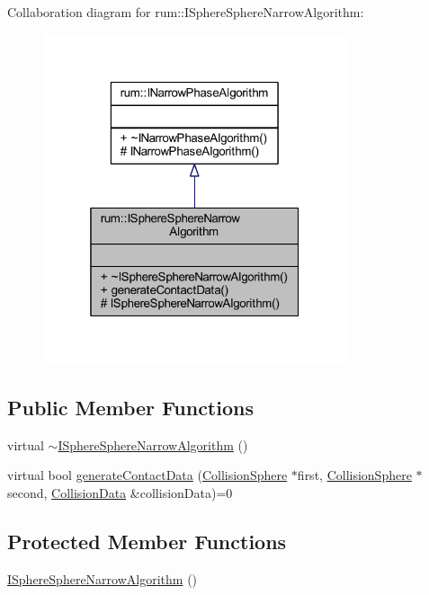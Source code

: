 Collaboration diagram for rum\+:\+:I\+Sphere\+Sphere\+Narrow\+Algorithm\+:\nopagebreak
\begin{figure}[H]
\begin{center}
\leavevmode
\includegraphics[width=253pt]{classrum_1_1_i_sphere_sphere_narrow_algorithm__coll__graph}
\end{center}
\end{figure}
\subsection*{Public Member Functions}
\begin{DoxyCompactItemize}
\item 
virtual \mbox{\hyperlink{classrum_1_1_i_sphere_sphere_narrow_algorithm_a48eb6187f1c07d3b7628778e6a818595}{$\sim$\+I\+Sphere\+Sphere\+Narrow\+Algorithm}} ()
\item 
virtual bool \mbox{\hyperlink{classrum_1_1_i_sphere_sphere_narrow_algorithm_a254273c64cab0473820639283f1e5e6f}{generate\+Contact\+Data}} (\mbox{\hyperlink{classrum_1_1_collision_sphere}{Collision\+Sphere}} $\ast$first, \mbox{\hyperlink{classrum_1_1_collision_sphere}{Collision\+Sphere}} $\ast$second, \mbox{\hyperlink{classrum_1_1_collision_data}{Collision\+Data}} \&collision\+Data)=0
\end{DoxyCompactItemize}
\subsection*{Protected Member Functions}
\begin{DoxyCompactItemize}
\item 
\mbox{\hyperlink{classrum_1_1_i_sphere_sphere_narrow_algorithm_a6c5c5a418895dccaef211a19ed8e5e9c}{I\+Sphere\+Sphere\+Narrow\+Algorithm}} ()
\end{DoxyCompactItemize}


